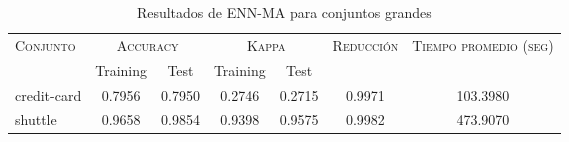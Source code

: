 \begin{table}[]
\centering
\begin{tabular}{l c c c c c c}
\hline
\multirow{2}{*}{\textsc{Conjunto}}
	& \multicolumn{2}{c}{\textsc{Accuracy}}
	& \multicolumn{2}{c}{\textsc{Kappa}}
	& \textsc{Reducción}
	& \textsc{Tiempo promedio (seg)} \\
	& Training & Test
	& Training & Test \\ 
\hline
\hline

credit-card & 0.7956 & 0.7950 & 0.2746 & 0.2715 & 0.9971 & 103.3980 \\
shuttle & 0.9658 & 0.9854 & 0.9398 & 0.9575 & 0.9982 & 473.9070 \\

\hline
\end{tabular}
\caption{Resultados de ENN-MA para conjuntos grandes }
\label{res-grande-ENN-MA}
\end{table}

